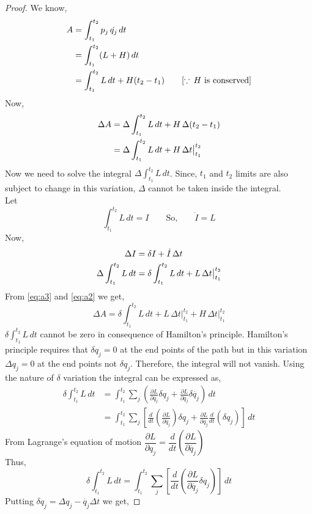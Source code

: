 \documentclass[12pt]{article}
\begin{document}
\begin{proof}
    We know,
    \begin{align}
        A&=\int_{t_1}^{t_2}p_j\,\dot{q_j}\,dt\notag\\
        &=\int_{t_1}^{t_2} (L+H)\,dt\notag\\
        &=\int_{t_1}^{t_2}L\,dt+H(t_2-t_1)\qquad \text{[\(\because\,H\) is conserved]}\label{eq:a1}
    \end{align}
    Now,
    \begin{align}
        \Delta A&=\Delta \int_{t_1}^{t_2}L\,dt+H\,\Delta(t_2-t_1)\notag\\
        &=\Delta \int_{t_1}^{t_2}L\,dt+H\,\Delta t\big|_{t_1}^{t_2}\label{eq:a2}
    \end{align}
    Now we need to solve the integral \(\Delta \int_{t_1}^{t_2}L\,dt\). Since, \(t_1\) and \(t_2\) limits are also subject to change in this variation, \(\Delta\) cannot be taken inside the integral.\\
    Let
    \[\int_{t_1}^{t_2}L\,dt=I\qquad\text{So,}\qquad \dot{I}=L\]
    Now,
    \begin{align}
        \Delta I&=\delta I+\dot{I}\,\Delta t\notag\\
        \Delta \int_{t_1}^{t_2}L\,dt&=\delta \int_{t_1}^{t_2}L\,dt+L\,\Delta t\big|_{t_1}^{t_2}\label{eq:a3}
    \end{align}
    From \eqref{eq:a3} and \eqref{eq:a2} we get,
    \begin{equation}
        \Delta A=\delta \int_{t_1}^{t_2}L\,dt+L\,\Delta t\big|_{t_1}^{t_2}+H\,\Delta t\big|_{t_1}^{t_2}\label{eq:a4}
    \end{equation}
    \(\delta \int_{t_1}^{t_2} L \,dt\) cannot be zero in consequence of Hamilton's principle. Hamilton's principle requires that \(\delta q_j=0\) at the end points of the path but in this variation \(\Delta q_j=0\) at the end points not \(\delta q_j\). Therefore, the integral will not vanish. Using the nature of \(\delta\) variation the integral can be expressed as,
    \begin{align*}
        \delta \int_{t_1}^{t_2}L\,dt&=\int_{t_1}^{t_2}\sum_j \left(\frac{\partial L}{\partial q_j}\delta q_j+\frac{\partial L}{\partial \dot{q_j}}\delta \dot{q_j}\right) \,dt\\
        &=\int_{t_1}^{t_2}\sum_j \left[\frac{d}{dt}\left(\frac{\partial L}{\partial \dot{q_j}}\right)\delta q_j+\frac{\partial L}{\partial \dot{q_j}}\frac{d}{dt}\left(\delta {q_j}\right)\right] \,dt
    \end{align*}
    From Lagrange's equation of motion \(\dfrac{\partial L}{\partial q_j}=\dfrac{d}{dt}\left(\dfrac{\partial L}{\partial \dot{q_j}}\right)\)\\
    Thus,
    \[\delta \int_{t_1}^{t_2}L\,dt=\int_{t_1}^{t_2}\sum_j \left[\frac{d}{dt}\left(\frac{\partial L}{\partial \dot{q_j}} \delta q_j\right)\right] \,dt\]
    Putting \(\delta q_j=\Delta q_j-\dot{q_j}\Delta t\) we get,
    
\end{proof}
\end{document}
